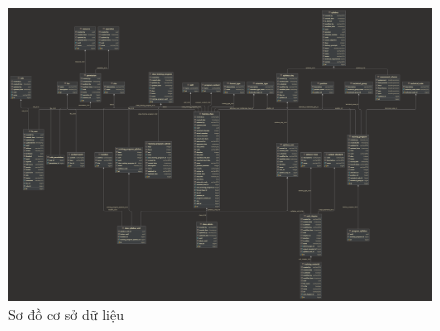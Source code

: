 \documentclass[report.tex]{subfiles}
\begin{document}
\begin{figure}[!htb]
{\centering
\includegraphics[width=500px]{../meta/db.diagrams.png}
\caption{Sơ đồ cơ sở dữ liệu}
\par
}
\end{figure}
\FloatBarrier
\end{document}
